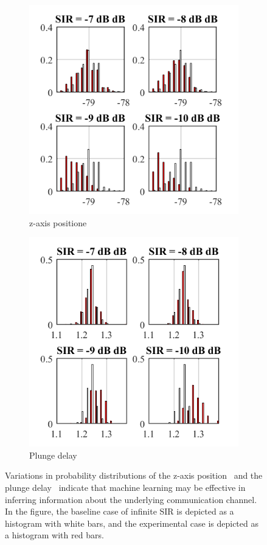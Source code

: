 \begin{figure}[!ht]
	\centering
	\begin{subfigure}{.75\textwidth}
		\centering
		\includegraphics[width=.8\linewidth]{./chapter-ftml/plots/ZPosHists}  
		\caption{z-axis positione}
		\label{ftml-conf:fig:results-zpos-hist}
	\end{subfigure}
	\begin{subfigure}{.75\textwidth}
		\centering
		\includegraphics[width=.8\linewidth]{./chapter-ftml/plots/DeltaTbc.png}  
		\caption{Plunge delay}
		\label{ftml-conf:fig:results-dtbc-hist}
	\end{subfigure}
	\caption{Variations in probability distributions of the z-axis position~\protect{} and the plunge delay~\protect{} indicate that machine learning may be effective in inferring information about the underlying communication channel. In the figure, the baseline case of infinite SIR is depicted as a histogram with white bars, and the experimental case is depicted as a histogram with red bars.}
	\label{ftml-conf:fig:results-hists}
\end{figure}



